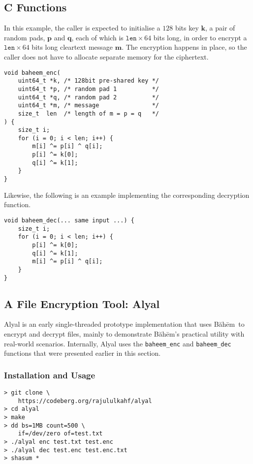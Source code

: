 \documentclass[twocolumn]{article}
\newcommand{\baheem}{Băhēm}
\begin{document}
\subsection{C Functions}
In this example, the caller is expected to initialise a $128$ bits key
$\mathbf{k}$, a pair of random pads, $\mathbf{p}$ and $\mathbf{q}$, each of
which is $\mathtt{len} \times 64$ bits long, in order to encrypt a
$\mathtt{len} \times 64$ bits long cleartext message $\mathbf{m}$.  The
encryption happens in place, so the caller does not have to allocate
separate memory for the ciphertext.

\begin{verbatim}
void baheem_enc(
    uint64_t *k, /* 128bit pre-shared key */
    uint64_t *p, /* random pad 1          */
    uint64_t *q, /* random pad 2          */
    uint64_t *m, /* message               */
    size_t  len  /* length of m = p = q   */
) {
    size_t i;
    for (i = 0; i < len; i++) {
        m[i] ^= p[i] ^ q[i];
        p[i] ^= k[0];
        q[i] ^= k[1];
    }
}
\end{verbatim}

Likewise, the following is an example implementing the corresponding
decryption function.

\begin{verbatim}
void baheem_dec(... same input ...) {
    size_t i;
    for (i = 0; i < len; i++) {
        p[i] ^= k[0];
        q[i] ^= k[1];
        m[i] ^= p[i] ^ q[i];
    }
}
\end{verbatim}

\subsection{A File Encryption Tool:  Alyal}
Alyal is an early single-threaded prototype implementation that uses
\baheem\ to encrypt and decrypt files, mainly to demonstrate \baheem's
practical utility with real-world scenarios.  Internally, Alyal uses the
\texttt{baheem\_enc} and \texttt{baheem\_dec} functions that were presented
earlier in this section.

\subsubsection{Installation and Usage}
\begin{verbatim}
> git clone \
    https://codeberg.org/rajululkahf/alyal
> cd alyal
> make
> dd bs=1MB count=500 \
    if=/dev/zero of=test.txt
> ./alyal enc test.txt test.enc
> ./alyal dec test.enc test.enc.txt
> shasum *
\end{verbatim}
\end{document}
